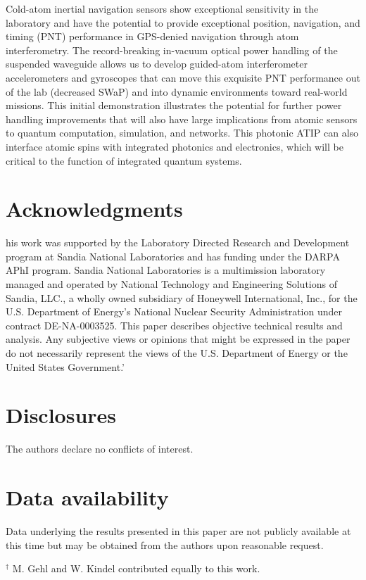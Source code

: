 \documentclass{osa-article}
\begin{document}
	Cold-atom inertial navigation sensors show exceptional sensitivity in the laboratory and have the potential to provide exceptional position, navigation, and timing (PNT) performance in GPS-denied navigation through atom interferometry. The record-breaking in-vacuum optical power handling of the suspended waveguide allows us to develop guided-atom interferometer accelerometers and gyroscopes that can move this exquisite PNT performance out of the lab (decreased SWaP) and into dynamic environments toward real-world missions. This initial demonstration illustrates the potential for further power handling improvements that will also have large implications from atomic sensors to quantum computation, simulation, and networks. This photonic ATIP can also interface atomic spins with integrated photonics and electronics, which will be critical to the function of integrated quantum systems. 


\section*{Acknowledgments}
his work was supported by the Laboratory Directed Research and Development program at Sandia National Laboratories and has funding under the DARPA APhI program. Sandia National Laboratories is a multimission laboratory managed and operated by National Technology and Engineering Solutions of Sandia, LLC., a wholly owned subsidiary of Honeywell International, Inc., for the U.S. Department of Energy's National Nuclear Security Administration under contract DE-NA-0003525. This paper describes objective technical results and analysis. Any subjective views or opinions that might be expressed in the paper do not necessarily represent the views of the U.S. Department of Energy or the United States Government.' 

\section*{Disclosures}
The authors declare no conflicts of interest.

\section*{Data availability}
Data underlying the results presented in this paper are not publicly available at this time but may be obtained from the authors upon reasonable request.

\medskip

$^{\dagger}$ M. Gehl and W. Kindel contributed equally to this work.
 
\end{document}
